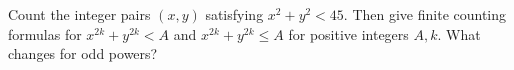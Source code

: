 Count the integer pairs $(x,y)$ satisfying $ x^2+y^2<45 $. Then give finite counting formulas for $ x^{2k}+y^{2k}<A $ and $ x^{2k}+y^{2k}\le A $ for positive integers $ A,k $. What changes for odd powers?
